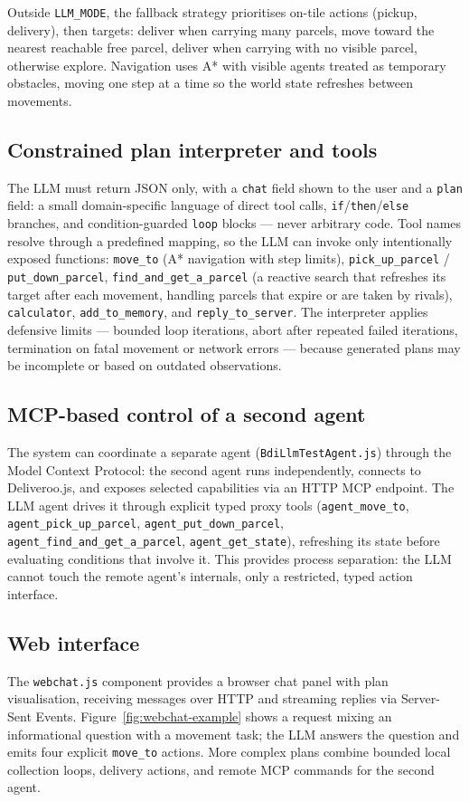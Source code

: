 Outside \texttt{LLM\_MODE}, the fallback strategy prioritises on-tile actions (pickup,
delivery), then targets: deliver when carrying many parcels, move toward the nearest reachable
free parcel, deliver when carrying with no visible parcel, otherwise explore. Navigation uses
A* with visible agents treated as temporary obstacles, moving one step at a time so the world
state refreshes between movements.

\subsection{Constrained plan interpreter and tools}
The LLM must return JSON only, with a \texttt{chat} field shown to the user and a \texttt{plan}
field: a small domain-specific language of direct tool calls,
\texttt{if}/\texttt{then}/\texttt{else} branches, and condition-guarded \texttt{loop} blocks ---
never arbitrary code. Tool names resolve through a predefined mapping, so the LLM can invoke
only intentionally exposed functions: \texttt{move\_to} (A* navigation with step limits),
\texttt{pick\_up\_parcel} / \texttt{put\_down\_parcel}, \texttt{find\_and\_get\_a\_parcel} (a
reactive search that refreshes its target after each movement, handling parcels that expire or
are taken by rivals), \texttt{calculator}, \texttt{add\_to\_memory}, and
\texttt{reply\_to\_server}. The interpreter applies defensive limits --- bounded loop iterations,
abort after repeated failed iterations, termination on fatal movement or network errors ---
because generated plans may be incomplete or based on outdated observations.

\subsection{MCP-based control of a second agent}
The system can coordinate a separate agent (\texttt{BdiLlmTestAgent.js}) through the Model
Context Protocol: the second agent runs independently, connects to Deliveroo.js, and exposes
selected capabilities via an HTTP MCP endpoint. The LLM agent drives it through explicit typed
proxy tools (\texttt{agent\_move\_to}, \texttt{agent\_pick\_up\_parcel},
\texttt{agent\_put\_down\_parcel}, \texttt{agent\_find\_and\_get\_a\_parcel},
\texttt{agent\_get\_state}), refreshing its state before evaluating conditions that involve it.
This provides process separation: the LLM cannot touch the remote agent's internals, only a
restricted, typed action interface.

\subsection{Web interface}
The \texttt{webchat.js} component provides a browser chat panel with plan visualisation,
receiving messages over HTTP and streaming replies via Server-Sent Events.
Figure~\ref{fig:webchat-example} shows a request mixing an informational question with a
movement task; the LLM answers the question and emits four explicit \texttt{move\_to} actions.
More complex plans combine bounded local collection loops, delivery actions, and remote MCP
commands for the second agent.

